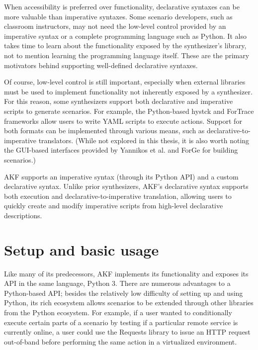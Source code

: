 \documentclass[letterpaper,12pt]{report}
\begin{document}
When accessibility is preferred over functionality, declarative syntaxes
can be more valuable than imperative syntaxes. Some scenario developers,
such as classroom instructors, may not need the low-level control
provided by an imperative syntax or a complete programming language such
as Python. It also takes time to learn about the functionality exposed
by the synthesizer's library, not to mention learning the programming
language itself. These are the primary motivators behind supporting
well-defined declarative syntaxes.

Of course, low-level control is still important, especially when
external libraries must be used to implement functionality not
inherently exposed by a synthesizer. For this reason, some synthesizers
support both declarative and imperative scripts to generate scenarios.
For example, the Python-based hystck and ForTrace frameworks
\cite{gobelNovelApproachGenerating2020,gobelForTraceHolisticForensic2022}
allow users to write YAML scripts to execute actions. Support for both
formats can be implemented through various means, such as
declarative-to-imperative translators. (While not explored in this
thesis, it is also worth noting the GUI-based interfaces provided by
Yannikos et al. \cite{yannikosDataCorporaDigital2014} and ForGe
\cite{vistiAutomaticCreationComputer2015} for building scenarios.)

AKF supports an imperative syntax (through its Python API) and a custom
declarative syntax. Unlike prior synthesizers, AKF's declarative syntax
supports both execution and declarative-to-imperative translation,
allowing users to quickly create and modify imperative scripts from
high-level declarative descriptions.

\section{Setup and basic usage}\label{setup-and-basic-usage}

Like many of its predecessors, AKF implements its functionality and
exposes its API in the same language, Python 3. There are numerous
advantages to a Python-based API; besides the relatively low difficulty
of setting up and using Python, its rich ecosystem allows scenarios to
be extended through other libraries from the Python ecosystem. For
example, if a user wanted to conditionally execute certain parts of a
scenario by testing if a particular remote service is currently online,
a user could use the Requests library \cite{Requests31Documentation}
to issue an HTTP request out-of-band before performing the same action
in a virtualized environment.
\end{document}
